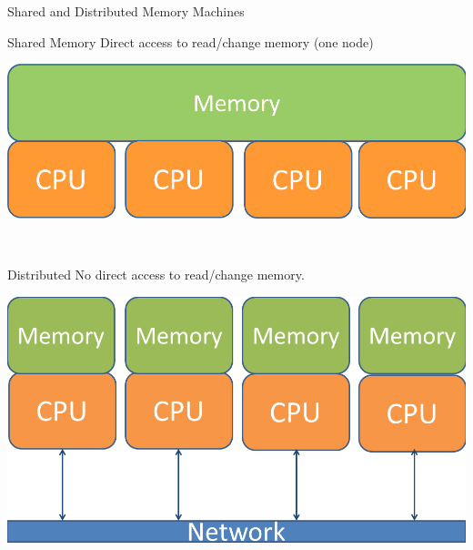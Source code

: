 \begin{frame}
  \begin{block}{Shared and Distributed Memory Machines}
   \begin{center}
    \begin{minipage}{.475\textwidth}
    \begin{block}{Shared Memory}
     Direct access to read/change memory (one node)
      \begin{center}
      \includegraphics[width=.95\textwidth]{pics/arch_shared}
      \end{center}
      \vspace{.3cm} \
    \end{block}
    \end{minipage}
    \hspace{.1cm}
    \begin{minipage}{.475\textwidth}
    \begin{block}{Distributed}
    No direct access to read/change memory.
      \begin{center}
      \includegraphics[width=.95\textwidth]{pics/arch_distributed}
      \end{center}
    \end{block}
    \end{minipage}
    \end{center}
    \end{block}
\end{frame}


